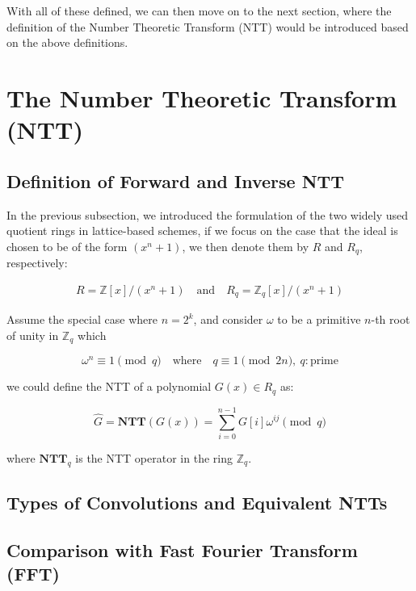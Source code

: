 \documentclass[12pt]{article}
\begin{document}
With all of these defined, we can then move on to the next section, 
where the definition of the Number Theoretic Transform (NTT) would be introduced based on the above definitions.

\section{The Number Theoretic Transform (NTT)}

\subsection{Definition of Forward and Inverse NTT}

In the previous subsection, 
we introduced the formulation of the two widely used quotient rings in lattice-based schemes, 
if we focus on the case that the ideal is chosen to be of the form $(x^n + 1)$, 
we then denote them by $R$ and $R_q$, respectively:

\begin{align*}
    R = \mathbb{Z}[x] / (x^n + 1) \quad \text{and} \quad R_q = \mathbb{Z}_q[x] / (x^n + 1)
\end{align*}

Assume the special case where $n = 2^k$, 
and consider $\omega$ to be a primitive $n$-th root of unity in $\mathbb{Z}_q$
which

\begin{equation*}
    \omega^n \equiv 1 \pmod{q} \quad \text{where} \quad q \equiv 1 \pmod{2n}, \ q: \text{prime} 
\end{equation*}

we could define the NTT of a polynomial $G(x) \in R_q$ as:

\begin{equation*}
    \hat{G} = \mathbf{NTT}(G(x)) = \sum_{i = 0}^{n - 1} G[i] \omega^{i j} \pmod{q}
\end{equation*}

where $\mathbf{NTT}_q$ is the NTT operator in the ring $\mathbb{Z}_q$.



\subsection{Types of Convolutions and Equivalent NTTs}

\subsection{Comparison with Fast Fourier Transform (FFT)}
\end{document}
